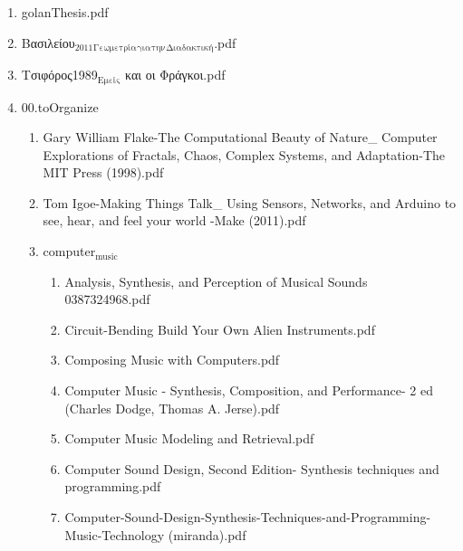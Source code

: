 \documentclass[11pt]{article}
\begin{document}
\begin{enumerate}
\begin{enumerate}
\begin{enumerate}
\begin{enumerate}
\begin{enumerate}
\item golanThesis.pdf
\label{sec-1-1-1-1-7-1-1-131}

\item Βασιλείου$_{\text{2011}}$$_{\text{Γεωμετρία}}$$_{\text{για}}$$_{\text{την}}$$_{\text{Διαδακτική}}$.pdf
\label{sec-1-1-1-1-7-1-1-132}

\item Τσιφόρος1989$_{\text{Εμείς}}$ και οι Φράγκοι.pdf
\label{sec-1-1-1-1-7-1-1-133}

\item 00.toOrganize
\label{sec-1-1-1-1-7-1-1-134}
\begin{enumerate}
\item Gary William Flake-The Computational Beauty of Nature\_ Computer Explorations of Fractals, Chaos, Complex Systems, and Adaptation-The MIT Press (1998).pdf
\label{sec-1-1-1-1-7-1-1-134-1}

\item Tom Igoe-Making Things Talk\_ Using Sensors, Networks, and Arduino to see, hear, and feel your world  -Make (2011).pdf
\label{sec-1-1-1-1-7-1-1-134-2}

\item computer$_{\text{music}}$
\label{sec-1-1-1-1-7-1-1-134-3}
\begin{enumerate}
\item Analysis, Synthesis, and Perception of Musical Sounds 0387324968.pdf
\label{sec-1-1-1-1-7-1-1-134-3-1}

\item Circuit-Bending Build Your Own Alien Instruments.pdf
\label{sec-1-1-1-1-7-1-1-134-3-2}

\item Composing Music with Computers.pdf
\label{sec-1-1-1-1-7-1-1-134-3-3}

\item Computer Music - Synthesis, Composition, and Performance- 2 ed (Charles Dodge, Thomas A. Jerse).pdf
\label{sec-1-1-1-1-7-1-1-134-3-4}

\item Computer Music Modeling and Retrieval.pdf
\label{sec-1-1-1-1-7-1-1-134-3-5}

\item Computer Sound Design, Second Edition- Synthesis techniques and programming.pdf
\label{sec-1-1-1-1-7-1-1-134-3-6}

\item Computer-Sound-Design-Synthesis-Techniques-and-Programming-Music-Technology (miranda).pdf
\label{sec-1-1-1-1-7-1-1-134-3-7}


\end{enumerate}
\end{enumerate}
\end{enumerate}
\end{enumerate}
\end{enumerate}
\end{enumerate}
\end{enumerate}
\end{document}
